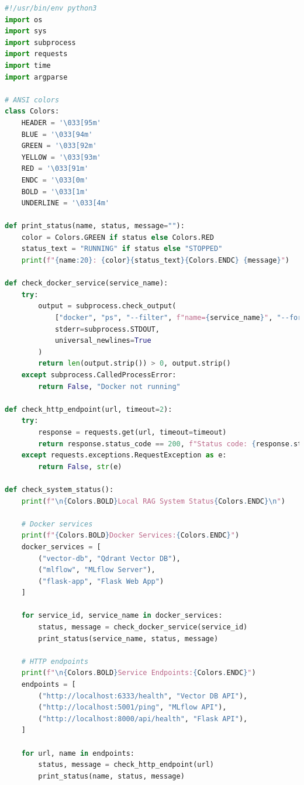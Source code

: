 \documentclass[
  screen,review,acmlarge]{acmart}
\begin{document}
\begin{lstlisting}[language=Python]
#!/usr/bin/env python3
import os
import sys
import subprocess
import requests
import time
import argparse

# ANSI colors
class Colors:
    HEADER = '\033[95m'
    BLUE = '\033[94m'
    GREEN = '\033[92m'
    YELLOW = '\033[93m'
    RED = '\033[91m'
    ENDC = '\033[0m'
    BOLD = '\033[1m'
    UNDERLINE = '\033[4m'

def print_status(name, status, message=""):
    color = Colors.GREEN if status else Colors.RED
    status_text = "RUNNING" if status else "STOPPED"
    print(f"{name:20}: {color}{status_text}{Colors.ENDC} {message}")

def check_docker_service(service_name):
    try:
        output = subprocess.check_output(
            ["docker", "ps", "--filter", f"name={service_name}", "--format", "{{.Status}}"],
            stderr=subprocess.STDOUT,
            universal_newlines=True
        )
        return len(output.strip()) > 0, output.strip()
    except subprocess.CalledProcessError:
        return False, "Docker not running"

def check_http_endpoint(url, timeout=2):
    try:
        response = requests.get(url, timeout=timeout)
        return response.status_code == 200, f"Status code: {response.status_code}"
    except requests.exceptions.RequestException as e:
        return False, str(e)

def check_system_status():
    print(f"\n{Colors.BOLD}Local RAG System Status{Colors.ENDC}\n")
    
    # Docker services
    print(f"{Colors.BOLD}Docker Services:{Colors.ENDC}")
    docker_services = [
        ("vector-db", "Qdrant Vector DB"),
        ("mlflow", "MLflow Server"),
        ("flask-app", "Flask Web App")
    ]
    
    for service_id, service_name in docker_services:
        status, message = check_docker_service(service_id)
        print_status(service_name, status, message)
    
    # HTTP endpoints
    print(f"\n{Colors.BOLD}Service Endpoints:{Colors.ENDC}")
    endpoints = [
        ("http://localhost:6333/health", "Vector DB API"),
        ("http://localhost:5001/ping", "MLflow API"),
        ("http://localhost:8000/api/health", "Flask API"),
    ]
    
    for url, name in endpoints:
        status, message = check_http_endpoint(url)
        print_status(name, status, message)
    

\end{lstlisting}
\end{document}

